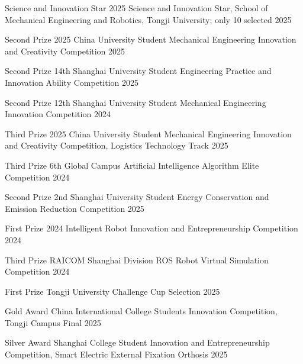 
\begin{cvhonors}

  \cvhonor
    {Science and Innovation Star}
    {2025 Science and Innovation Star, School of Mechanical Engineering and Robotics, Tongji University; only 10 selected}
    {}
    {2025}

  \cvhonor
    {Second Prize}
    {2025 China University Student Mechanical Engineering Innovation and Creativity Competition}
    {}
    {2025}

  \cvhonor
    {Second Prize}
    {14th Shanghai University Student Engineering Practice and Innovation Ability Competition}
    {}
    {2025}

  \cvhonor
    {Second Prize}
    {12th Shanghai University Student Mechanical Engineering Innovation Competition}
    {}
    {2024}

  \cvhonor
    {Third Prize}
    {2025 China University Student Mechanical Engineering Innovation and Creativity Competition, Logistics Technology Track}
    {}
    {2025}

  \cvhonor
    {Third Prize}
    {6th Global Campus Artificial Intelligence Algorithm Elite Competition}
    {}
    {2024}

  \cvhonor
    {Second Prize}
    {2nd Shanghai University Student Energy Conservation and Emission Reduction Competition}
    {}
    {2025}

  \cvhonor
    {First Prize}
    {2024 Intelligent Robot Innovation and Entrepreneurship Competition}
    {}
    {2024}

  \cvhonor
    {Third Prize}
    {RAICOM Shanghai Division ROS Robot Virtual Simulation Competition}
    {}
    {2024}

  \cvhonor
    {First Prize}
    {Tongji University Challenge Cup Selection}
    {}
    {2025}

  \cvhonor
    {Gold Award}
    {China International College Students Innovation Competition, Tongji Campus Final}
    {}
    {2025}

  \cvhonor
    {Silver Award}
    {Shanghai College Student Innovation and Entrepreneurship Competition, Smart Electric External Fixation Orthosis}
    {}
    {2025}

\end{cvhonors}
